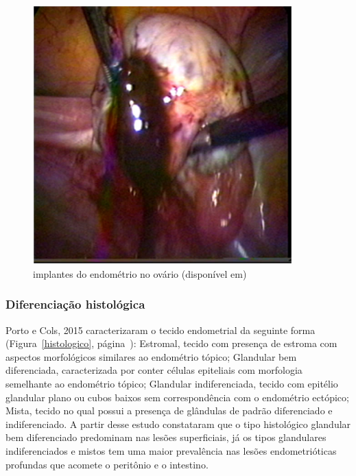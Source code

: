 \documentclass[12pt]{article} %
\begin{document}
\begin{figure}[h!] 
\centering
\includegraphics[width=10cm]{endometriomaroto.jpg}
\caption[Endometriose: implantes do endométrio no ovário] {implantes do endométrio no ovário (disponível em)}
\label{implantes do endometrio}
\end{figure} 


\subsubsection{Diferenciação histológica}

Porto e Cols, 2015 caracterizaram o tecido endometrial da seguinte
forma (Figura~\ref{histologico}, página~\pageref{histologico}):
Estromal, tecido com presença de estroma com aspectos morfológicos
similares ao endométrio tópico; Glandular bem diferenciada,
caracterizada por conter células epiteliais com morfologia semelhante
ao endométrio tópico; Glandular indiferenciada, tecido com epitélio
glandular plano ou cubos baixos sem correspondência com o endométrio
ectópico; Mista, tecido no qual possui a presença de glândulas de
padrão diferenciado e indiferenciado. A partir desse estudo
constataram que o tipo histológico glandular bem diferenciado
predominam nas lesões superficiais, já os tipos glandulares
indiferenciados e mistos tem uma maior prevalência nas lesões
endometrióticas profundas que acomete o peritônio e o intestino.
\end{document}
